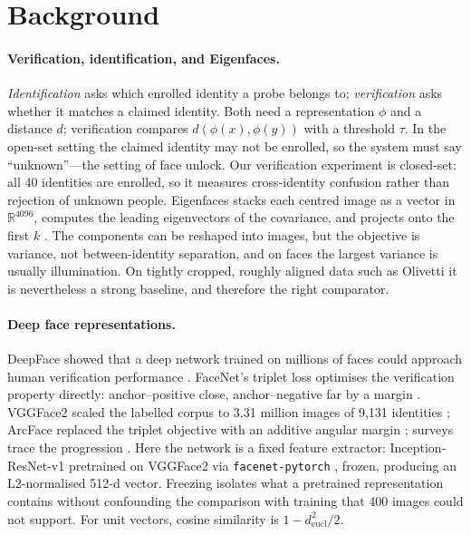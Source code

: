 \section{Background}\label{sec:background}

\paragraph{Verification, identification, and Eigenfaces.} \emph{Identification} asks which enrolled identity a probe belongs to; \emph{verification} asks whether it matches a claimed identity. Both need a representation $\phi$ and a distance $d$; verification compares $d(\phi(x),\phi(y))$ with a threshold $\tau$. In the open-set setting the claimed identity may not be enrolled, so the system must say ``unknown''---the setting of face unlock. Our verification experiment is closed-set: all 40 identities are enrolled, so it measures cross-identity confusion rather than rejection of unknown people. Eigenfaces stacks each centred image as a vector in $\mathbb{R}^{4096}$, computes the leading eigenvectors of the covariance, and projects onto the first $k$ \citep{turk1991}. The components can be reshaped into images, but the objective is variance, not between-identity separation, and on faces the largest variance is usually illumination. On tightly cropped, roughly aligned data such as Olivetti it is nevertheless a strong baseline, and therefore the right comparator.

\paragraph{Deep face representations.} DeepFace showed that a deep network trained on millions of faces could approach human verification performance \citep{taigman2014}. FaceNet's triplet loss optimises the verification property directly: anchor--positive close, anchor--negative far by a margin \citep{schroff2015}. VGGFace2 scaled the labelled corpus to 3.31 million images of 9,131 identities \citep{cao2018}; ArcFace replaced the triplet objective with an additive angular margin \citep{deng2019}; surveys trace the progression \citep{wang2021}. Here the network is a fixed feature extractor: Inception-ResNet-v1 \citep{szegedy2017} pretrained on VGGFace2 via \texttt{facenet-pytorch} \citep{facenetpytorch}, frozen, producing an L2-normalised 512-d vector. Freezing isolates what a pretrained representation contains without confounding the comparison with training that 400 images could not support. For unit vectors, cosine similarity is $1-d_{\mathrm{eucl}}^2/2$.

